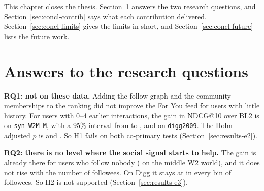 
\label{ch:concl}

This chapter closes the thesis. Section~\ref{sec:concl-answers} answers the two research questions, and Section~\ref{sec:concl-contrib} says what each contribution delivered. Section~\ref{sec:concl-limits} gives the limits in short, and Section~\ref{sec:concl-future} lists the future work.

\section{Answers to the research questions}
\label{sec:concl-answers}

\textbf{RQ1: not on these data.} Adding the follow graph and the community memberships to the ranking did not improve the For You feed for users with little history. For users with 0--4 earlier interactions, the gain in NDCG@10 over BL2 is \eTwoWTwoMNdcgTenZeroFourGain{} on \texttt{syn-W2M-M}, with a 95\% interval from \eTwoWTwoMNdcgTenZeroFourCiLow{} to \eTwoWTwoMNdcgTenZeroFourCiHigh{}, and \eTwoDiggNdcgTenZeroFourGainFull{} on \texttt{digg2009}. The Holm-adjusted $p$ is \eTwoWTwoMNdcgTenZeroFourPHolm{} and \eTwoDiggNdcgTenZeroFourPHolm{}. So H1 fails on both co-primary tests (Section~\ref{sec:results-e2}).

\textbf{RQ2: there is no level where the social signal starts to help.} The gain is already there for users who follow nobody (\eThreeWTwoMNdcgTenZeroGain{} on the middle W2 world), and it does not rise with the number of followees. On Digg it stays at \eThreeDiggNdcgTenZeroGain{} in every bin of followees. So H2 is not supported (Section~\ref{sec:results-e3}).

